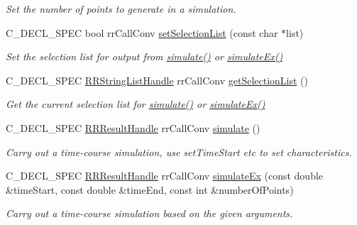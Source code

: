 \begin{DoxyCompactItemize}
\begin{DoxyCompactList}\small\item\em \-Set the number of points to generate in a simulation. \end{DoxyCompactList}\item 
\-C\-\_\-\-D\-E\-C\-L\-\_\-\-S\-P\-E\-C bool rr\-Call\-Conv \hyperlink{group__utility_ga6465c94b6dfed39a6ef614bd0a68cb9b}{set\-Selection\-List} (const char $\ast$list)
\begin{DoxyCompactList}\small\item\em \-Set the selection list for output from \hyperlink{group__simulation_ga9f0555c11716daec2336d54d13facc57}{simulate()} or \hyperlink{group__simulation_ga9b87919e79f6eb0d7c77c3daa08d6baf}{simulate\-Ex()} \end{DoxyCompactList}\item 
\-C\-\_\-\-D\-E\-C\-L\-\_\-\-S\-P\-E\-C \hyperlink{rr__c__types_8h_abf561b014879247b7b92ee99c205de21}{\-R\-R\-String\-List\-Handle} \*
rr\-Call\-Conv \hyperlink{group__utility_ga1db0b86ed7fd0d6e19f8df85b7577253}{get\-Selection\-List} ()
\begin{DoxyCompactList}\small\item\em \-Get the current selection list for \hyperlink{group__simulation_ga9f0555c11716daec2336d54d13facc57}{simulate()} or \hyperlink{group__simulation_ga9b87919e79f6eb0d7c77c3daa08d6baf}{simulate\-Ex()} \end{DoxyCompactList}\item 
\-C\-\_\-\-D\-E\-C\-L\-\_\-\-S\-P\-E\-C \hyperlink{rr__c__types_8h_a8c364bbdef9aab31c89655c38461da51}{\-R\-R\-Result\-Handle} \*
rr\-Call\-Conv \hyperlink{group__utility_ga9f0555c11716daec2336d54d13facc57}{simulate} ()
\begin{DoxyCompactList}\small\item\em \-Carry out a time-\/course simulation, use set\-Time\-Start etc to set characteristics. \end{DoxyCompactList}\item 
\-C\-\_\-\-D\-E\-C\-L\-\_\-\-S\-P\-E\-C \hyperlink{rr__c__types_8h_a8c364bbdef9aab31c89655c38461da51}{\-R\-R\-Result\-Handle} \*
rr\-Call\-Conv \hyperlink{group__utility_ga9b87919e79f6eb0d7c77c3daa08d6baf}{simulate\-Ex} (const double \&time\-Start, const double \&time\-End, const int \&number\-Of\-Points)
\begin{DoxyCompactList}\small\item\em \-Carry out a time-\/course simulation based on the given arguments. \end{DoxyCompactList}\item 

\end{DoxyCompactItemize}
